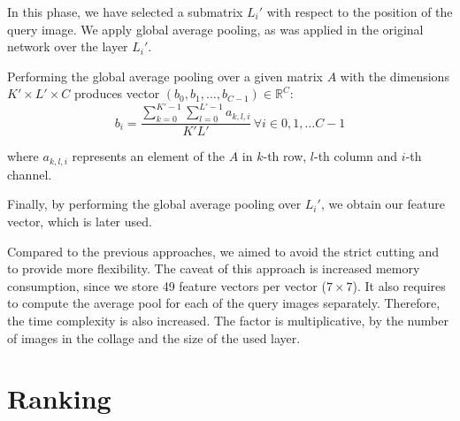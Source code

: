 In this phase, we have selected a submatrix $L_i'$ with respect to the position of the query image. We apply global average pooling, as was applied in the original network over the layer $L_i'$. 

Performing the global average pooling over a given matrix $A$ with the dimensions $K' \times L' \times C$ produces vector $(b_0, b_1, \ldots, b_{C-1}) \in \mathbb{R}^{C}$:
$$
    b_i = \frac{\sum_{k=0}^{K'-1} \sum_{l=0}^{L'-1} a_{k, l, i}} {K'L'} \, \forall i \in {0, 1, \ldots C-1}
$$

where $a_{k,l,i}$ represents an element of the $A$ in $k$-th row, $l$-th column and $i$-th channel.

Finally, by performing the global average pooling over $L_i'$, we obtain our feature vector, which is later used.

Compared to the previous approaches, we aimed to avoid the strict cutting and to provide more flexibility. The caveat of this approach is increased memory consumption, since we store 49 feature vectors per vector ($7\times7$). It also requires to compute the average pool for each of the query images separately. Therefore, the time complexity is also increased. The factor is multiplicative, by the number of images in the collage and the size of the used layer.



\section{Ranking}


